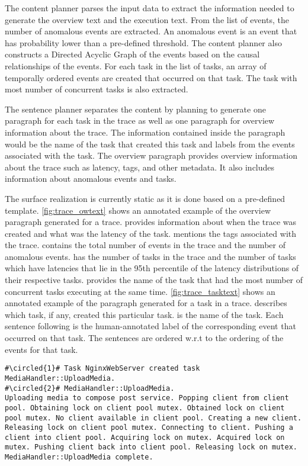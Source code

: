  The content planner parses the input data to extract the information
needed to generate the overview text and the execution text. From the list of events, the number
of anomalous events are extracted. An anomalous event is an event that has probability lower
than a pre-defined threshold. The content planner also constructs a Directed Acyclic Graph
of the events based on the causal relationships of the events. For each task in the list of tasks,
an array of temporally ordered events are created that occurred on that task. The task with most number of
concurrent tasks is also extracted.

 The sentence planner separates the content by planning to generate one paragraph
for each task in the trace as well as one paragraph for overview information about the trace.
The information contained inside the paragraph would be the name of the task that created this task
and labels from the events associated with the task.
The overview paragraph provides overview information about the trace such as latency, tags, and other metadata.
It also includes information about anomalous events and tasks.

 The surface realization is currently static as it is done based on
a pre-defined template. \autoref{fig:trace_owtext} shows an annotated example of the overview paragraph generated for a trace.
 provides information about when the trace was created and what was the latency of the task.
 mentions the tags associated with the trace.
 contains the total number of events in the trace and the number of anomalous events. 
 has the number of tasks in the trace and the number of tasks which have latencies that lie in the 95th percentile of the latency distributions
of their respective tasks. 
 provides the name of the task that had the most number of concurrent tasks executing at the same time.
\autoref{fig:trace_tasktext} shows an annotated example of the paragraph generated for a task in a trace.
 describes which task, if any, created this particular task.
 is the name of the task.
Each sentence following  is the human-annotated label of the corresponding event that occurred on that task.
The sentences are ordered w.r.t to the ordering of the events for that task.

\begin{lstlisting}[caption={Annotated paragraph generated for a task in a trace},captionpos=b,label={fig:trace_tasktext}, escapechar=\#]
#\circled{1}# Task NginxWebServer created task MediaHandler::UploadMedia. 
#\circled{2}# MediaHandler::UploadMedia. 
Uploading media to compose post service. Popping client from client pool. Obtaining lock on client pool mutex. Obtained lock on client pool mutex. No client available in client pool. Creating a new client. Releasing lock on client pool mutex. Connecting to client. Pushing a client into client pool. Acquiring lock on mutex. Acquired lock on mutex. Pushing client back into client pool. Releasing lock on mutex. MediaHandler::UploadMedia complete. 
\end{lstlisting}

